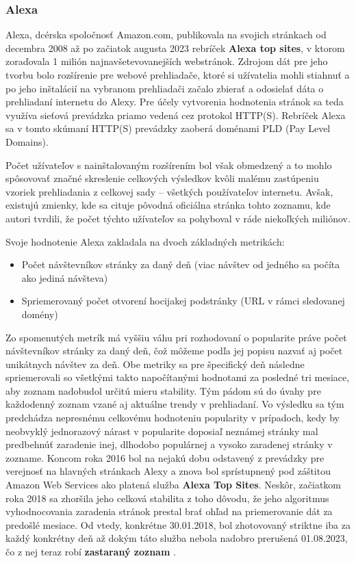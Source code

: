 \subsubsection{Alexa}

Alexa, dcérska spoločnosť Amazon.com, publikovala na svojich stránkach od decembra 2008 až po začiatok augusta 2023 rebríček \textbf{Alexa top sites}, v ktorom zoraďovala 1 milión 
najnavšetevovanejších webstránok. \cite{tranco-methodology}
Zdrojom dát pre jeho tvorbu bolo rozšírenie pre webové prehliadače, ktoré si užívatelia mohli stiahnuť a po jeho inštalácií na vybranom prehliadači začalo zbierať a odosielať
dáta o prehliadaní internetu do Alexy. 
Pre účely vytvorenia hodnotenia stránok sa teda využíva sieťová prevádzka priamo vedená cez protokol HTTP(S). 
Rebríček Alexa sa v tomto skúmaní HTTP(S) prevádzky zaoberá doménami PLD (Pay Level Domains). 

Počet užívateľov s nainštalovaným rozšírením bol však obmedzený 
a to mohlo spôsovovať značné skreslenie celkových výsledkov kvôli malému zastúpeniu vzoriek prehliadania z celkovej sady -- všetkých používateľov internetu. 
Avšak, existujú zmienky, kde sa cituje pôvodná oficiálna stránka tohto zoznamu, kde autori tvrdili, že počet týchto užívateľov sa pohyboval v ráde niekoľkých miliónov. \cite{tranco}

Svoje hodnotenie Alexa zakladala na dvoch základných metrikách: \cite{kinsta-alexa-rank-article}\cite{tranco}
\begin{itemize}
    \item Počet návštevníkov stránky za daný deň (viac návštev od jedného sa počíta ako jediná návšteva)
    \item Spriemerovaný počet otvorení hocijakej podstránky (URL v rámci sledovanej domény)
\end{itemize}

Zo spomenutých metrík má vyššiu váhu pri rozhodovaní o popularite práve počet návštevníkov stránky za daný deň, čož môžeme podľa jej popisu nazvať aj počet unikátnych návštev za deň. \cite{tranco}
Obe metriky sa pre špecifický deň následne spriemerovali so všetkými takto napočítanými hodnotami za posledné tri mesiace, aby zoznam nadobudol určitú mieru stability. 
Tým pádom sú do úvahy pre každodenný zoznam vzané aj aktuálne trendy v prehliadaní. Vo výsledku sa tým predchádza nepresnému celkovému hodnoteniu popularity v prípadoch, 
kedy by neobvyklý jednorazový nárast v popularite doposiaľ neznámej stránky mal predbehnúť zaradenie inej, dlhodobo populárnej a vysoko zaradenej stránky v zozname. 
Koncom roka 2016 bol na nejakú dobu odstavený z prevádzky pre verejnosť na hlavných stránkach Alexy a znova bol sprístupnený pod záštitou Amazon Web Services ako platená služba \textbf{Alexa Top Sites}. 
Neskôr, začiatkom roka 2018 sa zhoršila jeho celková stabilita z toho dôvodu, že jeho algoritmus vyhodnocovania zaradenia stránok prestal brať ohľad na priemerovanie dát za predošlé mesiace.
Od vtedy, konkrétne 30.01.2018, bol zhotovovaný striktne iba za každý konkrétny deň \cite{tranco} až dokým táto služba nebola nadobro prerušená 01.08.2023, čo z nej teraz robí \textbf{zastaraný zoznam} \cite{tranco-methodology}.

